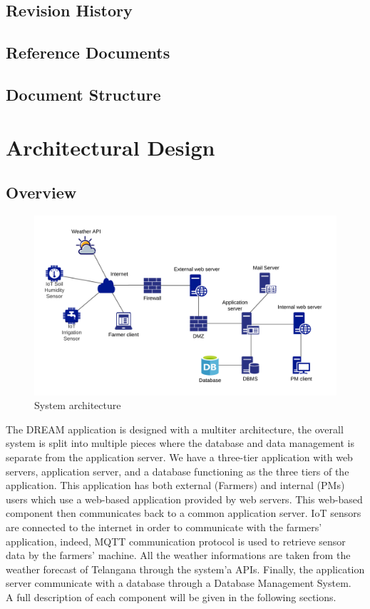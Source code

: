 \documentclass[10pt]{article} %
\begin{document}
\subsection{Revision History}
\subsection{Reference Documents}
\subsection{Document Structure}
\section{Architectural Design}
\subsection{Overview}
\begin{figure}[h]
    \centering
    \includegraphics[scale=0.7]{images/overview_architecture.png}
    \caption{System architecture}
    \label{fig:overview}
\end{figure}
The DREAM application is designed with a multiter architecture, the overall system is split into multiple pieces where 
the database and data management is separate from the application server. 
We have a three-tier application with web servers, application server, and a database functioning as the three tiers of the application.
This application has both external (Farmers) and internal (PMs) users which use a web-based application provided by web servers.
This web-based component then communicates back to a common application server. 
IoT sensors are connected to the internet in order to communicate with the farmers' application, indeed, MQTT communication protocol is used to retrieve sensor data by the farmers' machine.
All the weather informations are taken from the weather forecast of Telangana through the system'a APIs.
Finally, the application server communicate with a database through a Database Management System.\\
A full description of each component will be given in the following sections.
\end{document}
